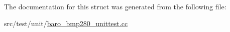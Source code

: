 The documentation for this struct was generated from the following file\+:\begin{DoxyCompactItemize}
\item 
src/test/unit/\hyperlink{baro__bmp280__unittest_8cc}{baro\+\_\+bmp280\+\_\+unittest.\+cc}\end{DoxyCompactItemize}
